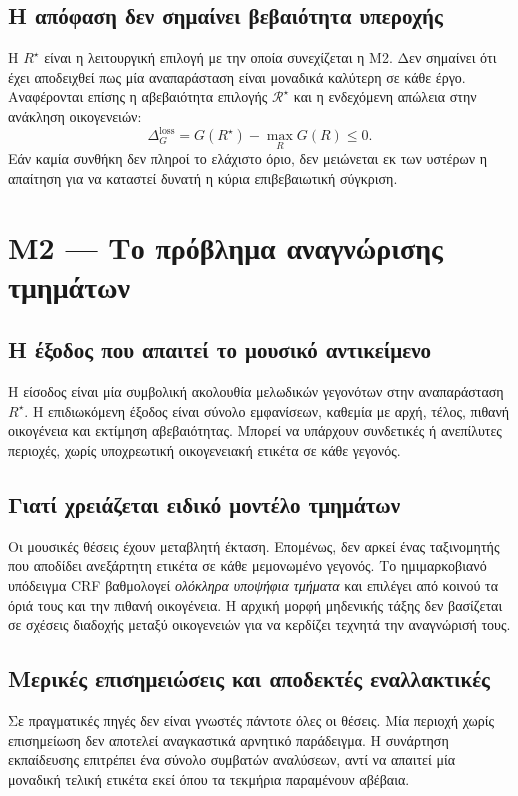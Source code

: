 \documentclass[11pt,a4paper]{extarticle}
\begin{document}
\subsection*{Η απόφαση δεν σημαίνει βεβαιότητα υπεροχής}
Η \(R^\star\) είναι η λειτουργική επιλογή με την οποία συνεχίζεται η M2. Δεν σημαίνει ότι έχει αποδειχθεί πως μία αναπαράσταση είναι μοναδικά καλύτερη σε κάθε έργο. Αναφέρονται επίσης η αβεβαιότητα επιλογής \(\mathcal R^\star\) και η ενδεχόμενη απώλεια στην ανάκληση οικογενειών:
\[
\Delta_G^{\mathrm{loss}}=G(R^\star)-\max_R G(R)\le 0.
\]
Εάν καμία συνθήκη δεν πληροί το ελάχιστο όριο, δεν μειώνεται εκ των υστέρων η απαίτηση για να καταστεί δυνατή η κύρια επιβεβαιωτική σύγκριση.


\section{M2 — Το πρόβλημα αναγνώρισης τμημάτων}
\subsection*{Η έξοδος που απαιτεί το μουσικό αντικείμενο}
Η είσοδος είναι μία συμβολική ακολουθία μελωδικών γεγονότων στην αναπαράσταση \(R^\star\). Η επιδιωκόμενη έξοδος είναι σύνολο εμφανίσεων, καθεμία με αρχή, τέλος, πιθανή οικογένεια και εκτίμηση αβεβαιότητας. Μπορεί να υπάρχουν συνδετικές ή ανεπίλυτες περιοχές, χωρίς υποχρεωτική οικογενειακή ετικέτα σε κάθε γεγονός.

\subsection*{Γιατί χρειάζεται ειδικό μοντέλο τμημάτων}
Οι μουσικές θέσεις έχουν μεταβλητή έκταση. Επομένως, δεν αρκεί ένας ταξινομητής που αποδίδει ανεξάρτητη ετικέτα σε κάθε μεμονωμένο γεγονός. Το ημιμαρκοβιανό υπόδειγμα CRF βαθμολογεί \emph{ολόκληρα υποψήφια τμήματα} και επιλέγει από κοινού τα όριά τους και την πιθανή οικογένεια. Η αρχική μορφή μηδενικής τάξης δεν βασίζεται σε σχέσεις διαδοχής μεταξύ οικογενειών για να κερδίζει τεχνητά την αναγνώρισή τους.

\subsection*{Μερικές επισημειώσεις και αποδεκτές εναλλακτικές}
Σε πραγματικές πηγές δεν είναι γνωστές πάντοτε όλες οι θέσεις. Μία περιοχή χωρίς επισημείωση δεν αποτελεί αναγκαστικά αρνητικό παράδειγμα. Η συνάρτηση εκπαίδευσης επιτρέπει ένα σύνολο συμβατών αναλύσεων, αντί να απαιτεί μία μοναδική τελική ετικέτα εκεί όπου τα τεκμήρια παραμένουν αβέβαια.
\end{document}
